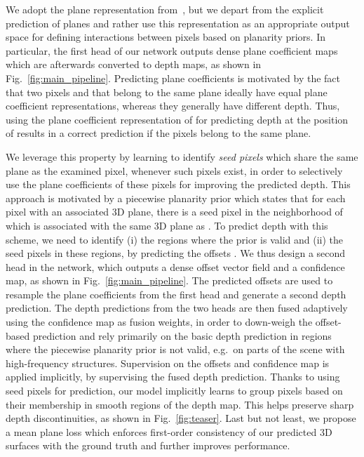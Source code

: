 \documentclass[final]{cvpr}
\begin{document}
We adopt the plane representation from~\cite{geolayout}, but we depart from the explicit prediction of planes and rather use this representation as an appropriate output space for defining interactions between pixels based on planarity priors. In particular, the first head of our network outputs dense plane coefficient maps which are afterwards converted to depth maps, as shown in Fig.~\ref{fig:main_pipeline}. Predicting plane coefficients is motivated by the fact that two pixels  and  that belong to the same plane ideally have equal plane coefficient representations, whereas they generally have different depth. Thus, using the plane coefficient representation of  for predicting depth at the position of  results in a correct prediction if the pixels belong to the same plane.

We leverage this property by learning to identify \emph{seed pixels} which share the same plane as the examined pixel, whenever such pixels exist, in order to selectively use the plane coefficients of these pixels for improving the predicted depth. This approach is motivated by a piecewise planarity prior which states that for each pixel  with an associated 3D plane, there is a seed pixel  in the neighborhood of  which is associated with the same 3D plane as . To predict depth with this scheme, we need to identify (i) the regions where the prior is valid and (ii) the seed pixels in these regions, by predicting the offsets . We thus design a second head in the network, which outputs a dense offset vector field and a confidence map, as shown in Fig.~\ref{fig:main_pipeline}. The predicted offsets are used to resample the plane coefficients from the first head and generate a second depth prediction. The depth predictions from the two heads are then fused adaptively using the confidence map as fusion weights, in order to down-weigh the offset-based prediction and rely primarily on the basic depth prediction in regions where the piecewise planarity prior is not valid, e.g.\ on parts of the scene with high-frequency structures. Supervision on the offsets and confidence map is applied implicitly, by supervising the fused depth prediction. Thanks to using seed pixels for prediction, our model implicitly learns to group pixels based on their membership in smooth regions of the depth map. This helps preserve sharp depth discontinuities, as shown in Fig.~\ref{fig:teaser}. Last but not least, we propose a mean plane loss which enforces first-order consistency of our predicted 3D surfaces with the ground truth and further improves performance.
\end{document}
